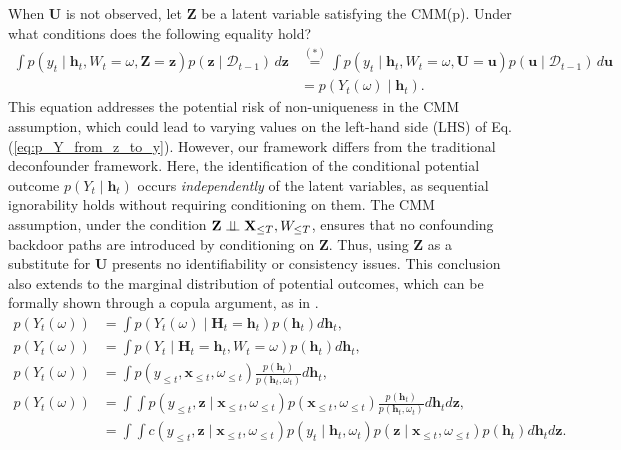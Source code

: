 \documentclass[10pt]{article} %
\begin{document}
When $\mathbf{U}$ is not observed, let $\mathbf{Z}$ be a latent variable satisfying the CMM(p). Under what conditions does the following equality hold?
\begin{equation}
    \begin{aligned}
    \int p(y_t \mid \mathbf{h}_t, W_t = \omega, \mathbf{Z} = \mathbf{z}) p(\mathbf{z} \mid \mathcal{D}_{t-1}) \, d\mathbf{z} 
    &\overset{(*)}{=} \int p(y_t \mid \mathbf{h}_t, W_t = \omega, \mathbf{U} = \mathbf{u}) p(\mathbf{u} \mid \mathcal{D}_{t-1}) \, d\mathbf{u} \\
    &= p(Y_{t}(\omega) \mid \mathbf{h}_t).
    \end{aligned}
    \label{eq:p_Y_from_z_to_y}
\end{equation}
This equation addresses the potential risk of non-uniqueness in the CMM assumption, which could lead to varying values on the left-hand side (LHS) of Eq. (\ref{eq:p_Y_from_z_to_y}). However, our framework differs from the traditional deconfounder framework. Here, the identification of the conditional potential outcome \(p(Y_t \mid \mathbf{h}_t)\) occurs \emph{independently} of the latent variables, as sequential ignorability holds without requiring conditioning on them. The CMM assumption, under the condition \(\mathbf{Z} \perp \!\!\! \perp \mathbf{X}_{\leq T}, W_{\leq T}\), ensures that no confounding backdoor paths are introduced by conditioning on \(\mathbf{Z}\). Thus, using \(\mathbf{Z}\) as a substitute for \(\mathbf{U}\) presents no identifiability or consistency issues. This conclusion also extends to the marginal distribution of potential outcomes, which can be formally shown through a copula argument, as in \cite{D'AmourMulti-Cause2019}.
\begin{equation}
\begin{aligned}
p(Y_{t}(\omega)) &= \int p(Y_{t}(\omega) \mid \mathbf{H}_t =  \mathbf{h}_t) p(\mathbf{h}_t) d\mathbf{h}_t, \\
p(Y_{t}(\omega)) &= \int p(Y_{t} \mid \mathbf{H}_t =  \mathbf{h}_t, W_t = \omega) p(\mathbf{h}_t) d\mathbf{h}_t, \\
p(Y_{t}(\omega)) &= \int p(y_{\leq t}, \mathbf{x}_{\leq t}, \omega_{\leq t}) \frac{p(\mathbf{h}_t)}{p(\mathbf{h}_t, \omega_t)} d\mathbf{h}_t, \\
p(Y_{t}(\omega)) &= \int \int p(y_{\leq t}, \mathbf{z} \mid \mathbf{x}_{\leq t}, \omega_{\leq t}) p(\mathbf{x}_{\leq t}, \omega_{\leq t}) \frac{p(\mathbf{h}_t)}{p(\mathbf{h}_t, \omega_t)} d\mathbf{h}_t d\mathbf{z}, \\
&= \int \int c(y_{\leq t}, \mathbf{z} \mid \mathbf{x}_{\leq t}, \omega_{\leq t}) p(y_t \mid \mathbf{h}_t, \omega_t) p(\mathbf{z} \mid \mathbf{x}_{\leq t}, \omega_{\leq t}) p(\mathbf{h}_t) d\mathbf{h}_t d\mathbf{z}.
\end{aligned}
\end{equation}
\end{document}
